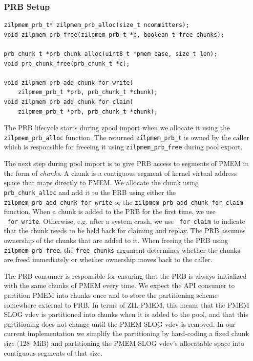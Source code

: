 \documentclass[12pt,a4paper,twoside]{book}
\begin{document}
\subsubsection{PRB Setup}\label{di:prb:api:setup}

\begin{lstlisting}
zilpmem_prb_t* zilpmem_prb_alloc(size_t ncommitters);
void zilpmem_prb_free(zilpmem_prb_t *b, boolean_t free_chunks);

prb_chunk_t *prb_chunk_alloc(uint8_t *pmem_base, size_t len);
void prb_chunk_free(prb_chunk_t *c);

void zilpmem_prb_add_chunk_for_write(
    zilpmem_prb_t *prb, prb_chunk_t *chunk);
void zilpmem_prb_add_chunk_for_claim(
    zilpmem_prb_t *prb, prb_chunk_t *chunk);
\end{lstlisting}

The PRB lifecycle starts during zpool import when we allocate it using the \lstinline{zilpmem_prb_alloc} function.
The returned \lstinline{zilpmem_prb_t} is owned by the caller which is responsible for freeeing it using \lstinline{zilpmem_prb_free} during pool export.

The next step during pool import is to give PRB access to segments of PMEM in the form of \textit{chunks}.
A chunk is a contiguous segment of kernel virtual address space that maps directly to PMEM.
We allocate the chunk using \lstinline{prb_chunk_alloc} and add it to the PRB using either the \lstinline{zilpmem_prb_add_chunk_for_write} or the \lstinline{zilpmem_prb_add_chunk_for_claim} function.
When a chunk is added to the PRB for the first time, we use \lstinline{_for_write}.
Otherwise, e.g. after a system crash, we use \lstinline{_for_claim} to indicate that the chunk needs to be held back for claiming and replay.
The PRB assumes ownership of the chunks that are added to it.
When freeing the PRB using \lstinline{zilpmem_prb_free}, the \lstinline{free_chunks} argument determines whether the chunks are freed immediately or whether ownership moves back to the caller.

The PRB consumer is responsible for ensuring that the PRB is always initialized with the same chunks of PMEM every time.
We expect the API consumer to partition PMEM into chunks once and to store the partitioning scheme somewhere external to PRB.
In terms of ZIL-PMEM, this means that the PMEM SLOG vdev is partitioned into chunks when it is added to the pool, and that this partitioning does not change until the PMEM SLOG vdev is removed.
In our current implementation we simplify the partitioning by hard-coding a fixed chunk size (\SI{128}{MiB}) and partitioning the PMEM SLOG vdev's allocatable space into contiguous segments of that size.
\end{document}
